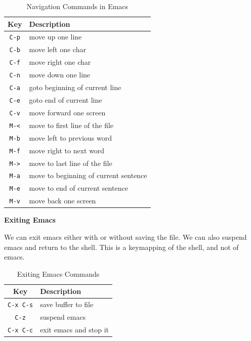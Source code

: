 \begin{table}[h!]
  \caption{Navigation Commands in Emacs}
  \begin{tabular}{c l}
    \toprule
    Key & Description \\
    \midrule
    \texttt{C-p} & move up one line \\
    \texttt{C-b} & move left one char \\
    \texttt{C-f} & move right one char \\
    \texttt{C-n} & move down one line \\
    \texttt{C-a} & goto beginning of current line \\
    \texttt{C-e} & goto end of current line \\
    \texttt{C-v} & move forward one screen \\
    \texttt{M-<} & move to first line of the file \\
    \texttt{M-b} & move left to previous word \\
    \texttt{M-f} & move right to next word \\
    \texttt{M->} & move to last line of the file \\
    \texttt{M-a} & move to beginning of current sentence \\
    \texttt{M-e} & move to end of current sentence \\
    \texttt{M-v} & move back one screen \\
    \bottomrule
  \end{tabular}
\end{table}

\textbf{Exiting Emacs}

We can exit emacs either with or without saving the file.
We can also suspend emacs and return to the shell.
This is a keymapping of the shell, and not of emacs.

\begin{table}[h!]
  \caption{Exiting Emacs Commands}
  \begin{tabular}{c l}
    \toprule
    Key & Description \\
    \midrule
    \texttt{C-x C-s} & save buffer to file \\
    \texttt{C-z} & suspend emacs \\
    \texttt{C-x C-c} & exit emacs and stop it \\
    \bottomrule
  \end{tabular}
\end{table}


